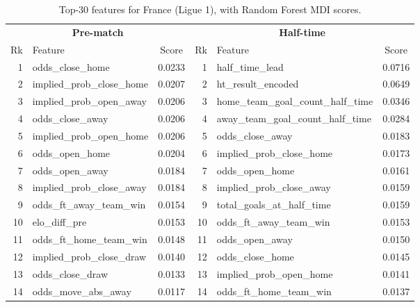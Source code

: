 \documentclass[pdflatex,sn-mathphys-num]{sn-jnl}
\theoremstyle{thmstyleone}
\theoremstyle{thmstyletwo}
\theoremstyle{thmstylethree}
\begin{document}
\begin{table}[h]
\caption{Top-30 features for France (Ligue 1), with Random Forest MDI scores.}\label{tab:fi-fra}
\footnotesize
\begin{tabular*}{\textwidth}{@{\extracolsep\fill}rlc|rlc@{}}
\toprule
\multicolumn{3}{c|}{\textbf{Pre-match}} & \multicolumn{3}{c}{\textbf{Half-time}} \\
Rk & Feature & Score & Rk & Feature & Score \\
\midrule
1  & odds\_close\_home                  & 0.0233 & 1  & half\_time\_lead                       & 0.0716 \\
2  & implied\_prob\_close\_home          & 0.0207 & 2  & ht\_result\_encoded                    & 0.0649 \\
3  & implied\_prob\_open\_away           & 0.0206 & 3  & home\_team\_goal\_count\_half\_time     & 0.0346 \\
4  & odds\_close\_away                  & 0.0206 & 4  & away\_team\_goal\_count\_half\_time     & 0.0284 \\
5  & implied\_prob\_open\_home           & 0.0206 & 5  & odds\_close\_away                       & 0.0183 \\
6  & odds\_open\_home                   & 0.0204 & 6  & implied\_prob\_close\_home              & 0.0173 \\
7  & odds\_open\_away                   & 0.0184 & 7  & odds\_open\_home                        & 0.0161 \\
8  & implied\_prob\_close\_away          & 0.0184 & 8  & implied\_prob\_close\_away              & 0.0159 \\
9  & odds\_ft\_away\_team\_win          & 0.0154 & 9  & total\_goals\_at\_half\_time            & 0.0159 \\
10 & elo\_diff\_pre                     & 0.0153 & 10 & odds\_ft\_away\_team\_win               & 0.0153 \\
11 & odds\_ft\_home\_team\_win          & 0.0148 & 11 & odds\_open\_away                        & 0.0150 \\
12 & implied\_prob\_close\_draw          & 0.0140 & 12 & odds\_close\_home                       & 0.0145 \\
13 & odds\_close\_draw                  & 0.0133 & 13 & implied\_prob\_open\_home               & 0.0141 \\
14 & odds\_move\_abs\_away               & 0.0117 & 14 & odds\_ft\_home\_team\_win               & 0.0137 \\

\end{tabular*}
\end{table}
\end{document}
